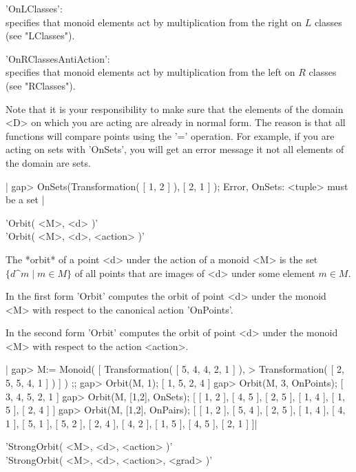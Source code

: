 'OnLClasses':\\
        specifies that  monoid  elements act by  multiplication  from the
        right on $L$ classes (see "LClasses").

'OnRClassesAntiAction':\\
        specifies that monoid   elements act by multiplication   from the
        left on $R$ classes (see "RClasses").

Note that it is your responsibility to make sure that the elements of the
domain <D>  on  which you are  acting  are already  in  normal form.  The
reason is that all functions will compare points using the '=' operation.
For example,  if you are acting on  sets with 'OnSets',  you  will get an
error message it not all elements of the domain are sets.

|    gap> OnSets(Transformation( [ 1, 2 ] ), [ 2, 1 ] );
    Error, OnSets: <tuple> must be a set |


'Orbit( <M>, <d> )'\\
'Orbit( <M>, <d>, <action> )'

The *orbit* of  a point <d> under the  action of a monoid  <M> is the set
$\{d\^m \mid m \in M\}$ of  all points that  are images of <d> under some
element $m \in M$.

In  the first  form  'Orbit' computes the   orbit of point  <d> under the
monoid <M> with respect to the canonical action 'OnPoints'.

In the second form  'Orbit'  computes the orbit   of point <d> under  the
monoid <M> with respect to the action <action>.

|    gap> M:= Monoid( [ Transformation( [ 5, 4, 4, 2, 1 ] ), 
    > Transformation( [ 2, 5, 5, 4, 1 ] ) ] ) ;;
    gap> Orbit(M, 1); 
    [ 1, 5, 2, 4 ]
    gap> Orbit(M, 3, OnPoints);
    [ 3, 4, 5, 2, 1 ]
    gap> Orbit(M, [1,2], OnSets);
    [ [ 1, 2 ], [ 4, 5 ], [ 2, 5 ], [ 1, 4 ], [ 1, 5 ], [ 2, 4 ] ]
    gap> Orbit(M, [1,2], OnPairs);
    [ [ 1, 2 ], [ 5, 4 ], [ 2, 5 ], [ 1, 4 ], [ 4, 1 ], [ 5, 1 ], [ 5, 2 ], 
      [ 2, 4 ], [ 4, 2 ], [ 1, 5 ], [ 4, 5 ], [ 2, 1 ] ]|


'StrongOrbit( <M>, <d>, <action> )'\\
'StrongOrbit( <M>, <d>, <action>, <grad> )'

